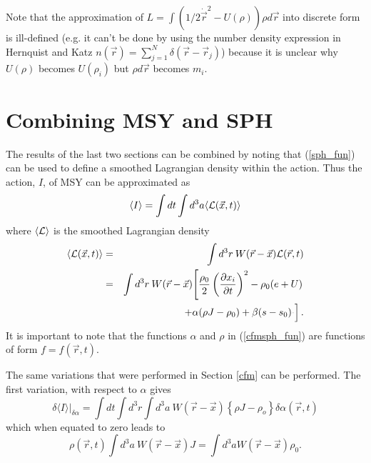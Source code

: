 Note that the approximation of $L = \int \left( 1/2 {\dot {\vec r}}^2 - U(\rho) \right) \rho d{\vec r}$ into discrete form is ill-defined (e.g. it can't be done by using the number density expression in Hernquist and Katz $n({\vec r}) = \sum_{j=1}^{N} \delta({\vec r} - {\vec r_j})$) because it is unclear why $U(\rho)$ becomes $U(\rho_i)$ but $\rho d{\vec r}$ becomes $m_i$. 
\section{Combining MSY and SPH}\label{cfmsph}

The results of the last two sections can be combined by noting that (\ref{sph_fun}) can be used to define a smoothed Lagrangian density within the action.  Thus the action, $I$, of MSY can be approximated as
\begin{equation}
\langle I \rangle = \int dt \int d^3a \langle {\cal L}({\vec x},t)\rangle
\end{equation}
where $\langle {\cal L} \rangle$ is the smoothed Lagrangian density
\begin{eqnarray}\label{cfmsph_fun}
\langle {\cal L}({\vec x},t) \rangle & = & \int d^3r \: W({\vec r} - {\vec x}){\cal L}({\vec r},t) \nonumber \\
& = & \int d^3r \: W({\vec r} - {\vec x}) \! \left[\frac{\rho_0}{2} \left( \frac{\partial x_i}{\partial t}\right)^2 - \rho_0(e+U) \right. \nonumber \\
& & \left. + \alpha (\rho J - {\rho}_0) + \beta (s- s_0) \frac{^{}}{}\right].
\end{eqnarray}
It is important to note that the functions $\alpha$ and $\rho$ in (\ref{cfmsph_fun}) are functions of form $f = f({\vec r}, t)$.

The same variations that were performed in Section \ref{cfm} can be performed.
The first variation, with respect to $\alpha$ gives
\begin{equation}
\delta \langle I \rangle \vert_{\delta \alpha} = \int dt \int d^3r \int d^3a \: W({\vec r} - {\vec x}) \left\{ \rho J - \rho_o \right\} \delta \alpha({\vec r},t)
\end{equation}
which when equated to zero leads to
\begin{equation}
\rho({\vec r},t) \int d^3a \: W({\vec r} - {\vec x}) J = \int d^3a W({\vec r} - {\vec x}) \rho_0.
\end{equation}

